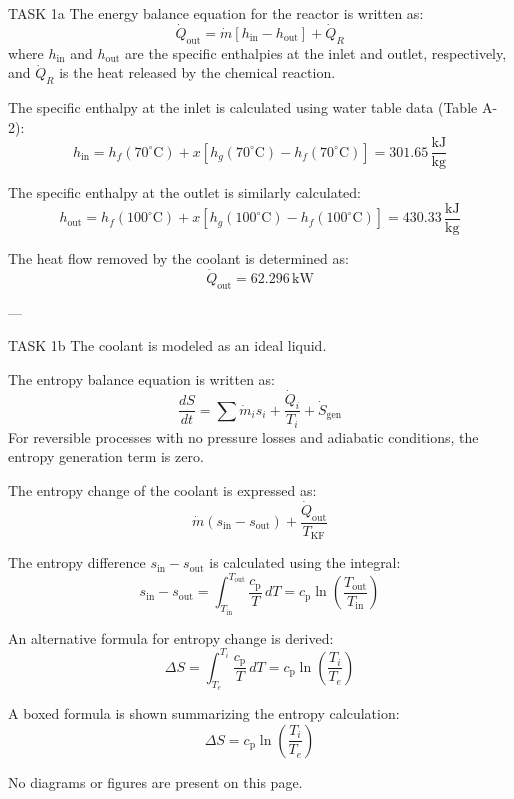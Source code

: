 TASK 1a  
The energy balance equation for the reactor is written as:  
\[
\dot{Q}_{\text{out}} = \dot{m} \left[ h_{\text{in}} - h_{\text{out}} \right] + \dot{Q}_R
\]  
where \( h_{\text{in}} \) and \( h_{\text{out}} \) are the specific enthalpies at the inlet and outlet, respectively, and \( \dot{Q}_R \) is the heat released by the chemical reaction.  

The specific enthalpy at the inlet is calculated using water table data (Table A-2):  
\[
h_{\text{in}} = h_f(70^\circ\text{C}) + x \left[ h_g(70^\circ\text{C}) - h_f(70^\circ\text{C}) \right] = 301.65 \, \frac{\text{kJ}}{\text{kg}}
\]  

The specific enthalpy at the outlet is similarly calculated:  
\[
h_{\text{out}} = h_f(100^\circ\text{C}) + x \left[ h_g(100^\circ\text{C}) - h_f(100^\circ\text{C}) \right] = 430.33 \, \frac{\text{kJ}}{\text{kg}}
\]  

The heat flow removed by the coolant is determined as:  
\[
\dot{Q}_{\text{out}} = 62.296 \, \text{kW}
\]  

---

TASK 1b  
The coolant is modeled as an ideal liquid.  

The entropy balance equation is written as:  
\[
\frac{dS}{dt} = \sum \dot{m}_i s_i + \frac{\dot{Q}_i}{T_i} + \dot{S}_{\text{gen}}
\]  
For reversible processes with no pressure losses and adiabatic conditions, the entropy generation term is zero.  

The entropy change of the coolant is expressed as:  
\[
\dot{m} \left( s_{\text{in}} - s_{\text{out}} \right) + \frac{\dot{Q}_{\text{out}}}{T_{\text{KF}}}
\]  

The entropy difference \( s_{\text{in}} - s_{\text{out}} \) is calculated using the integral:  
\[
s_{\text{in}} - s_{\text{out}} = \int_{T_{\text{in}}}^{T_{\text{out}}} \frac{c_{\text{p}}}{T} \, dT = c_{\text{p}} \ln \left( \frac{T_{\text{out}}}{T_{\text{in}}} \right)
\]  

An alternative formula for entropy change is derived:  
\[
\Delta S = \int_{T_e}^{T_i} \frac{c_{\text{p}}}{T} \, dT = c_{\text{p}} \ln \left( \frac{T_i}{T_e} \right)
\]  

A boxed formula is shown summarizing the entropy calculation:  
\[
\Delta S = c_{\text{p}} \ln \left( \frac{T_i}{T_e} \right)
\]  

No diagrams or figures are present on this page.